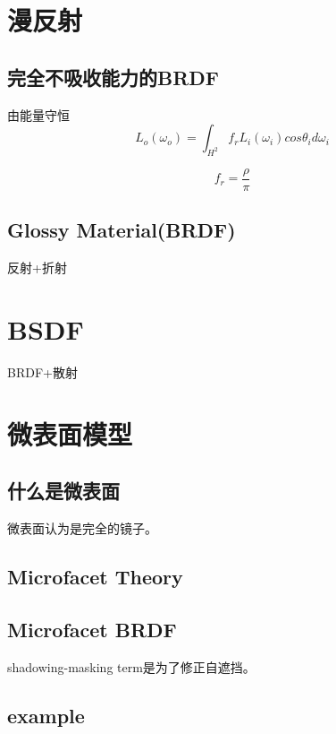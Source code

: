 \section{漫反射}

\subsection*{完全不吸收能力的BRDF}
由能量守恒
\begin{equation}
    L_o(\omega_o)=\int_{H^2}f_rL_i(\omega_i)cos\theta_i d\omega_i
\end{equation}


\begin{equation}
    f_r=\frac{\rho}{\pi}
\end{equation}

\subsection*{Glossy Material(BRDF)}

反射+折射

\section{BSDF}

BRDF+散射

\section{微表面模型}

\subsection*{什么是微表面}

微表面认为是完全的镜子。

\subsection*{Microfacet Theory}

\subsection*{Microfacet BRDF}

shadowing-masking term是为了修正自遮挡。

\subsection*{example}

